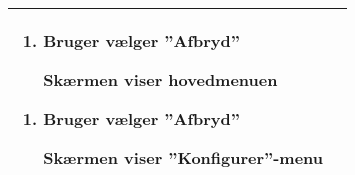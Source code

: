 \begin{center}
\begin{longtable}{|p{5cm}|p{9cm}|}
\begin{enumerate}[label=\ref{uc2afbryd}.a]
				\item Bruger vælger ''Afbryd''
				
					\subitem Skærmen viser hovedmenuen
			\end{enumerate}		
			
			\begin{enumerate}[label=\ref{uc2afbryd3}.a]
				
				\item Bruger vælger ''Afbryd''
				
				\subitem Skærmen viser ''Konfigurer''-menu
				

			\end{enumerate}														\\\hline
	\end{longtable}
\end{center}


